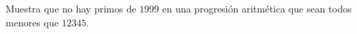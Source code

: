 Muestra que no hay primos de $1999$ en una progresión aritmética que sean todos menores que $12345$. 